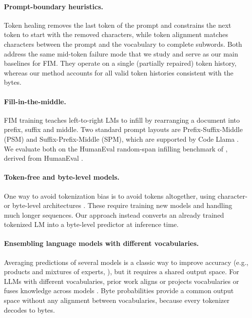 \documentclass{article} %
\begin{document}
\paragraph{Prompt-boundary heuristics.}
Token healing \citep{dagan2024getting} removes the last token of the prompt and constrains the next token to start with the removed characters, while token alignment \citep{athiwaratkun2024token} matches characters between the prompt and the vocabulary to complete subwords. Both address the same mid-token failure mode that we study and serve as our main baselines for FIM. They operate on a single (partially repaired) token history, whereas our method accounts for all valid token histories consistent with the bytes.

\paragraph{Fill-in-the-middle.}
FIM training \citep{bavarian2022fim,fried2023incoder} teaches left-to-right LMs to infill by rearranging a document into prefix, suffix and middle. Two standard prompt layouts are Prefix-Suffix-Middle (PSM) and Suffix-Prefix-Middle (SPM), which are supported by Code Llama \citep{roziere2023codellama}. We evaluate both on the HumanEval random-span infilling benchmark of \citet{bavarian2022fim}, derived from HumanEval \citep{chen2021humaneval}.

\paragraph{Token-free and byte-level models.}
One way to avoid tokenization bias is to avoid tokens altogether, using character- or byte-level architectures \citep{clark2022canine,tay2022charformer,xue2022byt5,yu2023megabyte,wang2024mambabyte}. These require training new models and handling much longer sequences. Our approach instead converts an already trained tokenized LM into a byte-level predictor at inference time.

\paragraph{Ensembling language models with different vocabularies.}
Averaging predictions of several models is a classic way to improve accuracy (e.g., products and mixtures of experts, \citealp{hinton2002product,jacobs1991adaptive,shazeer2017outrageously}), but it requires a shared output space. For LLMs with different vocabularies, prior work aligns or projects vocabularies \citep{xu2024bridging,huang2024ensemble} or fuses knowledge across models \citep{wan2024knowledge}. Byte probabilities provide a common output space without any alignment between vocabularies, because every tokenizer decodes to bytes.
\end{document}
